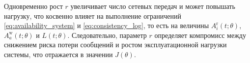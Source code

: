 Одновременно рост $r$ увеличивает число сетевых передач и может повышать нагрузку,
что косвенно влияет на выполнение ограничений \eqref{eq:availability_system}
и \eqref{eq:consistency_log},
то есть на величины
$A_i^{\mathrm{r}}(t;\theta)$,
$A_a^{\mathrm{w}}(t;\theta)$
и
$L(t;\theta)$.
Следовательно, параметр $r$ определяет компромисс между снижением риска потери
сообщений и ростом эксплуатационной нагрузки системы, что отражается в значении $J(\theta)$.
